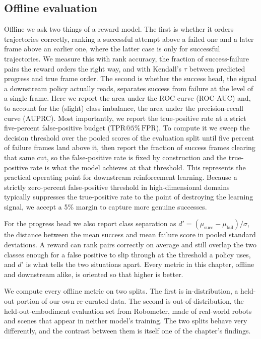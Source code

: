 \subsection{Offline evaluation}

Offline we ask two things of a reward model. The first is whether it orders trajectories correctly, ranking a successful attempt above a failed one and a later frame above an earlier one, where the latter case is only for successful trajectories. We measure this with rank accuracy, the fraction of success-failure pairs the reward orders the right way, and with Kendall's $\tau$ between predicted progress and true frame order. The second is whether the success head, the signal a downstream policy actually reads, separates success from failure at the level of a single frame. Here we report the area under the ROC curve (ROC-AUC) and, to account for the (slight) class imbalance, the area under the precision-recall curve (AUPRC). Most importantly, we report the true-positive rate at a strict five-percent false-positive budget ($\mathrm{TPR}@5\%\,\mathrm{FPR}$). To compute it we sweep the decision threshold over the pooled scores of the evaluation split until five percent of failure frames land above it, then report the fraction of success frames clearing that same cut, so the false-positive rate is fixed by construction and the true-positive rate is what the model achieves at that threshold. This represents the practical operating point for downstream reinforcement learning. Because a strictly zero-percent false-positive threshold in high-dimensional domains typically suppresses the true-positive rate to the point of destroying the learning signal, we accept a 5\% margin to capture more genuine successes.

For the progress head we also report class separation as $d' = (\mu_{\mathrm{succ}} - \mu_{\mathrm{fail}})/\sigma$, the distance between the mean success and mean failure score in pooled standard deviations. A reward can rank pairs correctly on average and still overlap the two classes enough for a false positive to slip through at the threshold a policy uses, and $d'$ is what tells the two situations apart. Every metric in this chapter, offline and downstream alike, is oriented so that higher is better.

We compute every offline metric on two splits. The first is in-distribution, a held-out portion of our own re-curated data. The second is out-of-distribution, the held-out-embodiment evaluation set from Robometer, made of real-world robots and scenes that appear in neither model's training. The two splits behave very differently, and the contrast between them is itself one of the chapter's findings.

